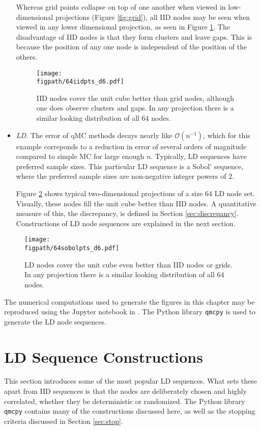\documentclass{svproc}
\newcommand{\figpath}{Figures}
\begin{document}
\begin{itemize}
	Whereas grid points collapse on top of one another when viewed in low-dimensional projections (Figure \ref{fig:grid}), all IID nodes may be seen when viewed in any lower dimensional projection, as seen in Figure \ref{fig:iid}.  The disadvantage of IID nodes is that they form clusters and leave gaps.  This is because the position of any one node is independent of the position of the others.

\begin{figure}
	\centering
	\texttt{[image: \\figpath/64iidpts\_d6.pdf]}
	\caption{IID nodes cover the unit cube better than grid nodes, although one does observe clusters and gaps.  In any  projection there is  a similar looking distribution of all $64$ nodes. \label{fig:iid}}
\end{figure}

	\item \emph{LD.}  The error of qMC methods decays nearly like $\mathcal{O}(n^{-1})$, which for this example correponds to a reduction in error of several orders of magnitude compared to simple MC for large enough $n$.  Typically, LD sequences have preferred sample sizes.  This particular LD sequence is a Sobol' sequence, where the preferred sample sizes are non-negative integer powers of $2$.

	Figure \ref{fig:ld} shows typical two-dimensional projections of a size $64$ LD node set.  Visually, these nodes fill the unit cube better than IID nodes.  A quantitative measure of this, the discrepancy, is defined in Section \ref{sec:discrepancy}.  Constructions of LD node sequences are explained in the next section.

\end{itemize}



\begin{figure}
	\centering
	\texttt{[image: \\figpath/64sobolpts\_d6.pdf]}
	\caption{LD nodes cover the unit cube even better than IID nodes or grids.  In any  projection there is  a similar looking distribution of all $64$ nodes. \label{fig:ld}}
\end{figure}

The numerical computations used to generate the figures in this chapter may be reproduced using the Jupyter notebook in \cite{MCQMC2024TutorialNotebook}. The Python library \texttt{qmcpy} \cite{QMCPy2020a} is used to generate the LD node sequences. 

\section{LD Sequence Constructions} \label{sec:construct}
This section introduces some of the most popular LD sequences.  What sets these apart from IID sequences is that the nodes are deliberately chosen and highly correlated, whether they be deterministic or randomized. The Python library \texttt{qmcpy} \cite{QMCPy2020a} contains many of the constructions discussed here, as well as the stopping criteria discussed in Section \ref{sec:stop}.
\end{document}
